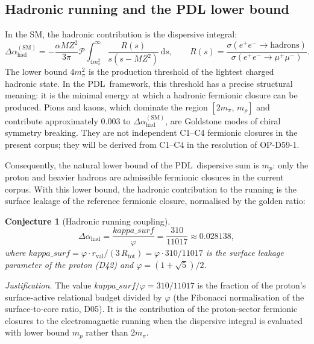 \documentclass[12pt,a4paper]{article}
\newtheorem{conjecture}[theorem]{Conjecture}
\theoremstyle{remark}
\newcommand{\PDL}{\textsc{pdl}}
\newcommand{\ksurf}{\kappa_{\mathrm{surf}}}
\newcommand{\Dahad}{\Delta\alpha_{\mathrm{had}}}
\newcommand{\MZ}{M_{Z}}
\newcommand{\mproton}{m_{p}}
\def\PDL{PDL}%
\def\MZ{MZ}%
\def\ksurf{kappa\_surf}%
\begin{document}
\subsection{Hadronic running and the PDL lower bound}

In the SM, the hadronic contribution is the dispersive integral:
\begin{equation}\label{eq:dahad_SM}
\Dahad^{(\mathrm{SM})} = -\frac{\alpha\MZ^{2}}{3\pi}
\mathcal{P}\!\int_{4m_{\pi}^{2}}^{\infty}
\frac{R(s)}{s(s-\MZ^{2})}\,\mathrm{d}s, \qquad
R(s) = \frac{\sigma(e^{+}e^{-}\to\mathrm{hadrons})}{\sigma(e^{+}e^{-}\to\mu^{+}\mu^{-})}.
\end{equation}
The lower bound $4m_{\pi}^{2}$ is the production threshold of the lightest
charged hadronic state. In the \PDL\ framework, this threshold has a precise
structural meaning: it is the minimal energy at which a hadronic fermionic
closure can be produced. Pions and kaons, which dominate the region
$[2m_{\pi},\,m_{\rho}]$ and contribute approximately $0.003$ to
$\Dahad^{(\mathrm{SM})}$, are Goldstone modes of chiral symmetry breaking.
They are not independent C1--C4 fermionic closures in the present corpus; they
will be derived from C1--C4 in the resolution of OP-D59-1.

Consequently, the natural lower bound of the \PDL\ dispersive sum is $\mproton$:
only the proton and heavier hadrons are admissible fermionic closures in the
current corpus. With this lower bound, the hadronic contribution to the running
is the surface leakage of the reference fermionic closure, normalised by the
golden ratio:

\begin{conjecture}[Hadronic running coupling]\label{conj:dahad}
\begin{equation}\label{eq:dahad}
\Dahad = \frac{\ksurf}{\varphi} = \frac{310}{11017} \approx 0.028138,
\end{equation}
where $\ksurf=\varphi\cdot r_{\mathrm{val}}/(3\,R_{\mathrm{tot}})=\varphi\cdot310/11017$
is the surface leakage parameter of the proton (D42) and $\varphi=(1+\sqrt{5})/2$.
\end{conjecture}

\emph{Justification.} The value $\ksurf/\varphi=310/11017$ is the fraction of
the proton's surface-active relational budget divided by $\varphi$ (the
Fibonacci normalisation of the surface-to-core ratio, D05). It is the
contribution of the proton-sector fermionic closures to the electromagnetic
running when the dispersive integral is evaluated with lower bound $\mproton$
rather than $2m_{\pi}$.
\end{document}
